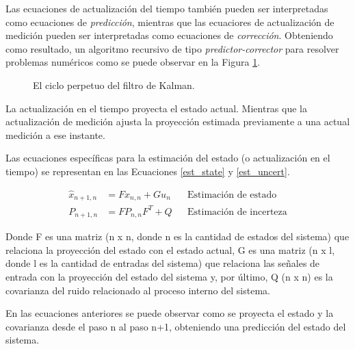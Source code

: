 \documentclass[10pt,a4paper]{article}
\begin{document}
\noindent Las ecuaciones de actualizaci\'on del tiempo tambi\'en pueden ser 
interpretadas como ecuaciones de \emph{predicci\'on}, mientras que las 
ecuaciores de actualizaci\'on de medici\'on pueden ser interpretadas como 
ecuaciones de \emph{correcci\'on}. Obteniendo como resultado, un algoritmo 
recursivo de tipo \emph{predictor-corrector} para resolver problemas num\'ericos 
como se puede observar en la Figura \ref{kalman_filter_sch}.

\begin{figure}[h!]
    \begin{center}
    \caption{El ciclo perpetuo del filtro de Kalman. }
    \label{kalman_filter_sch}
    \end{center}
\end{figure}
\FloatBarrier

La actualizaci\'on en el tiempo proyecta el estado actual. Mientras que la
actualizaci\'on de medici\'on ajusta la proyecci\'on estimada previamente a una
actual medici\'on a ese instante.

Las ecuaciones específicas para la estimaci\'on del estado (o actualizaci\'on en
el tiempo) se representan en las Ecuaciones \ref{est_state} y \ref{est_uncert}.

\begin{align}
    \hat{x}_{n+1, n} &= F\hat{x}_{n,n} + Gu_n & & \textrm{Estimaci\'on de estado}
    \label{est_state} \\
    P_{n+1,n} &= FP_{n,n}F^T + Q & & \textrm{Estimaci\'on de incerteza}
    \label{est_uncert}
\end{align}

\noindent Donde F es una matriz (n x n, donde n es la cantidad de estados del 
sistema) que relaciona la proyecci\'on del estado con el estado actual, G es una 
matriz (n x l, donde l es la cantidad de entradas del sistema) que relaciona las 
señales de entrada con la proyecci\'on del estado del sistema y, por \'ultimo, 
Q (n x n) es la covarianza del ruido relacionado al proceso interno del sistema.

\noindent En las ecuaciones anteriores se puede observar como se proyecta el 
estado y la covarianza desde el paso n al paso n+1, obteniendo una predicci\'on 
del estado del sistema.
\end{document}
